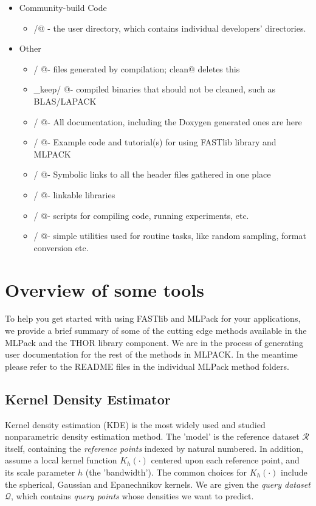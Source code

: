 \documentclass[letter]{report}
\begin{document}
\begin{itemize}
\begin{itemize}
\begin{itemize}
    \end{itemize}
  \end{itemize}
\item Community-build Code
  \begin {itemize}
  \item \verb@contrib/@ - the user directory, which contains individual developers' directories. 
  \end {itemize} 
\item  Other
  \begin {itemize}
  \item \verb@bin/      @- files generated by compilation; \verb@make clean@ deletes this
  \item \verb@bin_keep/ @- compiled binaries that should not be cleaned, such as BLAS/LAPACK
  \item \verb@doc/      @- All documentation, including the Doxygen generated ones are here
  \item \verb@examples/ @- Example code and tutorial(s) for using FASTlib library and MLPACK
  \item \verb@include/  @- Symbolic links to all the header files gathered in one place
  \item \verb@lib/      @- linkable libraries
  \item \verb@script/   @- scripts for compiling code, running experiments, etc.
  \item \verb@util/     @- simple utilities used for routine tasks, like random sampling, format conversion etc.
  \end {itemize}
\end{itemize}

\section{Overview of some tools}
To help you get started with using FASTlib and MLPack for your applications, we provide a brief summary of some of the cutting edge methods available in the MLPack and the THOR library component. We are in the process of generating user documentation for the rest of the methods in MLPACK. In the meantime please refer to the README files in the individual MLPack method folders.

\subsection{Kernel Density Estimator}
Kernel density estimation (KDE) is the most widely used and studied nonparametric density estimation method. The 'model' is the reference dataset $\mathcal{R}$ itself, containing the {\it reference points}
indexed by natural numbered. In addition, assume a local kernel function $K_h(\cdot)$ centered upon each reference point, and its scale parameter $h$ (the 'bandwidth'). The common choices for $K_h(\cdot)$ include the spherical, Gaussian and Epanechnikov kernels. We are given the {\it query dataset} $\mathcal{Q}$, which contains {\it query points} whose densities we want to predict.
\end{document}
